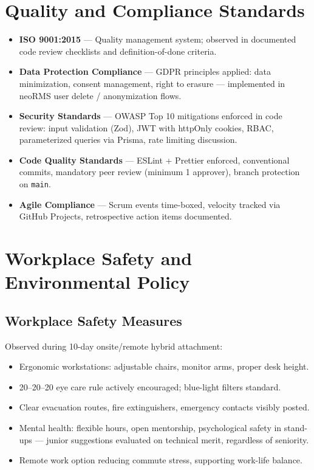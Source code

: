 \section{Quality and Compliance Standards}
\label{sec:compliance}

\begin{itemize}
\item \textbf{ISO 9001:2015} --- Quality management system; observed in documented code review checklists and definition-of-done criteria.
\item \textbf{Data Protection Compliance} --- GDPR principles applied: data minimization, consent management, right to erasure --- implemented in neoRMS user delete / anonymization flows.
\item \textbf{Security Standards} --- OWASP Top 10 mitigations enforced in code review: input validation (Zod), JWT with httpOnly cookies, RBAC, parameterized queries via Prisma, rate limiting discussion.
\item \textbf{Code Quality Standards} --- ESLint + Prettier enforced, conventional commits, mandatory peer review (minimum 1 approver), branch protection on \texttt{main}.
\item \textbf{Agile Compliance} --- Scrum events time-boxed, velocity tracked via GitHub Projects, retrospective action items documented.
\end{itemize}

\section{Workplace Safety and Environmental Policy}
\label{sec:safety}

\subsection{Workplace Safety Measures}
Observed during 10-day onsite/remote hybrid attachment:
\begin{itemize}
\item Ergonomic workstations: adjustable chairs, monitor arms, proper desk height.
\item 20--20--20 eye care rule actively encouraged; blue-light filters standard.
\item Clear evacuation routes, fire extinguishers, emergency contacts visibly posted.
\item Mental health: flexible hours, open mentorship, psychological safety in stand-ups --- junior suggestions evaluated on technical merit, regardless of seniority.
\item Remote work option reducing commute stress, supporting work-life balance.
\end{itemize}

